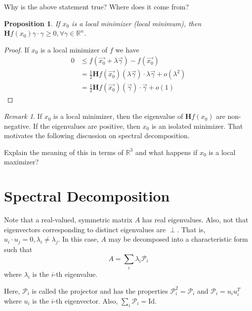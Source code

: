 \documentclass[12pt]{article}
\newcommand{\R}{\mathbb{R}}
\newcommand{\Proj}{\mathcal{P}}
\newtheorem{proposition}{Proposition}[theorem]
\theoremstyle{definition}
\theoremstyle{remark}
\newtheorem*{remark}{Remark}
\newenvironment{question}[2][QUESTION]{\begin{trivlist}
\item[\hskip \labelsep {\bfseries #1}\hskip \labelsep {\bfseries #2.}]}{\end{trivlist}}
\begin{document}
\begin{question}{9}
   Why is the above statement true? Where does it come from?\vspace{2in} 
\end{question}

\begin{proposition}
    If $x_0$ is a local minimizer (local minimum), then $\textbf{H}f(x_0)\gamma\cdot\gamma\geq0,\forall\gamma\in\R^n$.
\end{proposition}
\begin{proof}
   If $x_0$ is a local minimizer of $f$ we have
   \begin{align*}
      0&\leq f(\vec{x_0}+\lambda\vec{\gamma}) - f(\vec{x_0})\\
      &=\frac{1}{2}\textbf{H}f(\vec{x_0})(\lambda\vec{\gamma})\cdot\lambda\vec{\gamma}+o(\lambda^2)\\
      &=\frac{1}{2}\textbf{H}f(\vec{x_0})(\vec{\gamma})\cdot\vec{\gamma}+o(1)
   \end{align*} 
\end{proof}

\begin{remark}
   If $x_0$ is a local minimizer, then the eigenvalue of $\textbf{H}f(x_0)$ are non-negative. If the eigenvalues are positive, then $x_0$ is an isolated minimizer. That motivates the following discussion on spectral decomposition.
   \begin{question}{10}
      Explain the meaning of this in terms of $\R^3$ and what happens if $x_0$ is a local maximizer?\vspace{2in} 
   \end{question}
\end{remark}

\section{Spectral Decomposition}
Note that a real-valued, symmetric matrix $A$ has real eigenvalues.
Also, not that eigenvectors corresponding to distinct eigenvalues are $\perp$.
That is, $u_i\cdot u_j=0, \lambda_i\not=\lambda_j$.
In this case, $A$ may be decomposed into a characteristic form such that $$A=\sum_i\lambda_i\mathcal{P}_i$$ where $\lambda_i$ is the $i$-th eigenvalue.

Here, $\mathcal{P}_i$ is called the projector and has the properties $\Proj_i^2=\Proj_i$ and $\Proj_i = u_iu_i^T$ where $u_i$ is the $i$-th eigenvector. Also, $\sum_i\Proj_i=\text{Id}$.
\end{document}
